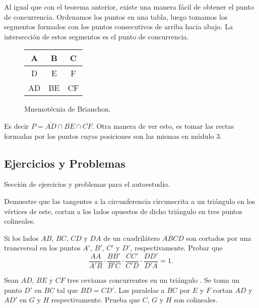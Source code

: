 \begin{remark.tcb}
    Al igual que con el teorema anterior, existe una manera fácil de obtener el punto de concurrencia.
    Ordenamos los puntos en una tabla, luego tomamos los segmentos formados con los puntos consecutivos de arriba hacia abajo.
    La intersección de estos segmentos es el punto de concurrencia.
    \begin{figure}[H]
        \centering
        \begin{tabular}{|c|c|c|}
            \hline
            A & B & C\\\hline
            D & E & F\\
            \hline \hline
            AD & BE & CF \\
            \hline
        \end{tabular}
        \caption{Mnemotécnia de Brianchon.}
    \end{figure}
    Es decir $P = \overline{AD} \cap \overline{BE} \cap \overline{CF}$.
    Otra manera de ver esto, es tomar las rectas formadas por los puntos cuyas posiciones son las mismas en módulo 3.
\end{remark.tcb}




\subsection{Ejercicios y Problemas}

Sección de ejercicios y problemas para el autoestudio.

\begin{section-problem}
    Demuestre que las tangentes a la circunferencia circunscrita a un triángulo en los vértices de este, cortan a los lados opuestos de dicho triángulo en tres puntos colineales.
\end{section-problem}

\begin{section-problem}
    Si los lados $AB$, $BC$, $CD$ y $DA$ de un cuadrilátero $ABCD$ son cortados por una transversal en los puntos $A'$, $B'$, $C'$ y $D'$, respectivamente.
    Probar que
    \[
        \dfrac{AA}{A'B} \cdot \dfrac{BB'}{B'C} \cdot \dfrac{CC'}{C'D} \cdot \dfrac{DD'}{D'A} = 1.
    \]
\end{section-problem}

\begin{section-problem}
    Sean $AD$, $BE$ y $CF$ tres cevianas concurrentes en un triángulo .
    Se toma un punto $D'$ en $BC$ tal que $BD = CD'$.
    Las paralelas a $BC$ por $E$ y $F$ cortan $AD$ y $AD'$ en $G$ y $H$ respectivamente.
    Prueba que $C$, $G$ y $H$ son colineales.
\end{section-problem}

